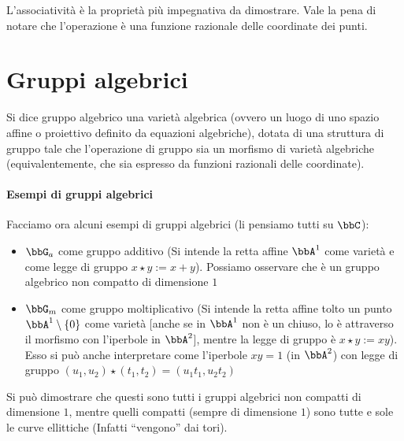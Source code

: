 
L'associatività è la proprietà più impegnativa da dimostrare. Vale la pena di notare che l'operazione è una funzione razionale delle coordinate dei punti.


\section{Gruppi algebrici}
\begin{definizione}
  Si dice gruppo algebrico una varietà algebrica (ovvero un luogo di uno spazio affine o proiettivo definito da equazioni algebriche), dotata di una struttura di gruppo tale che l'operazione di gruppo sia un morfismo di varietà algebriche (equivalentemente, che sia espresso da funzioni razionali delle coordinate).
\end{definizione}

\paragraph{Esempi di gruppi algebrici}
Facciamo ora alcuni esempi di gruppi algebrici (li pensiamo tutti su $\bbC$):
\begin{itemize}
\item $\bbG_a$ come gruppo additivo (Si intende la retta affine $\bbA^1$ come varietà e come legge di gruppo $x \star y := x + y$). Possiamo osservare che è un gruppo algebrico non compatto di dimensione $1$
\item $\bbG_m$ come gruppo moltiplicativo (Si intende la retta affine tolto un punto $\bbA^1 \setminus \{ 0 \}$ come varietà [anche se in $\bbA^1$ non è un chiuso, lo è attraverso il morfismo con l'iperbole in $\bbA^2$], mentre la legge di gruppo è $x \star y := x y$). \\
  Esso si può anche interpretare come l'iperbole $xy=1$ (in $\bbA^2$) con legge di gruppo $(u_1, u_2) \star (t_1, t_2) = (u_1 t_1, u_2 t_2)$
\end{itemize}

Si può dimostrare che questi sono tutti i gruppi algebrici non compatti di dimensione $1$, mentre quelli compatti (sempre di dimensione $1$) sono tutte e sole le curve ellittiche (Infatti ``vengono'' dai tori).





